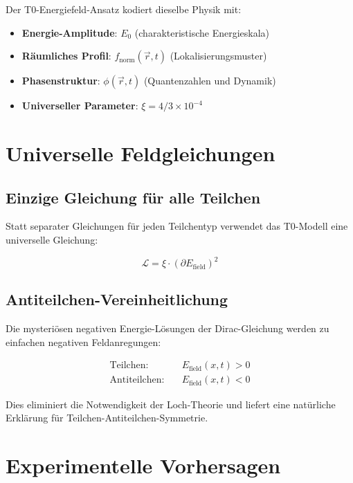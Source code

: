 \documentclass[12pt,a4paper]{report}
\begin{document}
	Der T0-Energiefeld-Ansatz kodiert dieselbe Physik mit:
	\begin{itemize}
		\item \textbf{Energie-Amplitude}: $E_0$ (charakteristische Energieskala)
		\item \textbf{Räumliches Profil}: $f_{\text{norm}}(\vec{r}, t)$ (Lokalisierungsmuster)
		\item \textbf{Phasenstruktur}: $\phi(\vec{r}, t)$ (Quantenzahlen und Dynamik)
		\item \textbf{Universeller Parameter}: $\xi = 4/3 \times 10^{-4}$
	\end{itemize}
	
	\section{Universelle Feldgleichungen}
	\label{sec:universal_equations}
	
	\subsection{Einzige Gleichung für alle Teilchen}
	\label{subsec:single_equation}
	
	Statt separater Gleichungen für jeden Teilchentyp verwendet das T0-Modell eine universelle Gleichung:
	
	\begin{equation}
		\boxed{\mathcal{L} = \xi \cdot (\partial E_{\text{field}})^2}
		\label{eq:universal_lagrangian}
	\end{equation}
	
	\subsection{Antiteilchen-Vereinheitlichung}
	\label{subsec:antiparticle_unification}
	
	Die mysteriösen negativen Energie-Lösungen der Dirac-Gleichung werden zu einfachen negativen Feldanregungen:
	
	\begin{align}
		\text{Teilchen:} \quad &E_{\text{field}}(x,t) > 0 \\
		\text{Antiteilchen:} \quad &E_{\text{field}}(x,t) < 0
	\end{align}
	
	Dies eliminiert die Notwendigkeit der Loch-Theorie und liefert eine natürliche Erklärung für Teilchen-Antiteilchen-Symmetrie.
	
	\section{Experimentelle Vorhersagen}
	\label{sec:experimental_predictions}
	
\end{document}
